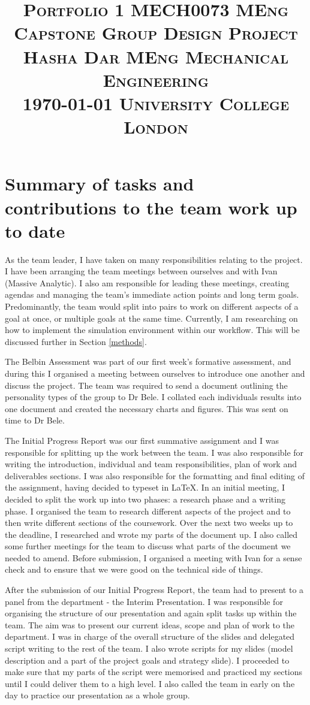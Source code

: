 \documentclass[11pt]{article}
\title{
    \textsc{\huge Portfolio 1 }\hfill \textsc{\large MECH0073 MEng Capstone Group Design Project}\\%
    \textsc{\large Hasha Dar} \hfill \textsc{\large MEng Mechanical Engineering }\\
    \textsc{\large \today} \hfill \textsc{\large University College London }
}
\date{}
\begin{document}
\maketitle
\section{Summary of tasks and contributions to the team work up to date}
As the team leader, I have taken on many responsibilities relating to the project. I have been arranging the team meetings between ourselves and with Ivan (Massive Analytic). I also am responsible for leading these meetings, creating agendas and managing the team's immediate action points and long term goals. Predominantly, the team would split into pairs to work on different aspects of a goal at once, or multiple goals at the same time. Currently, I am researching on how to implement the simulation environment within our workflow. This will be discussed further in Section \ref{methods}.

The Belbin Assessment was part of our first week's formative assessment, and during this I organised a meeting between ourselves to introduce one another and discuss the project. The team was required to send a document outlining the personality types of the group to Dr Bele. I collated each individuals results into one document and created the necessary charts and figures. This was sent on time to Dr Bele.

The Initial Progress Report was our first summative assignment and I was responsible for splitting up the work between the team. I was also responsible for writing the introduction, individual and team responsibilities, plan of work and deliverables sections. I was also responsible for the formatting and final editing of the assignment, having decided to typeset in \LaTeX. In an initial meeting, I decided to split the work up into two phases: a research phase and a writing phase. I organised the team to research different aspects of the project and to then write different sections of the coursework. Over the next two weeks up to the deadline, I researched and wrote my parts of the document up. I also called some further meetings for the team to discuss what parts of the document we needed to amend. Before submission, I organised a meeting with Ivan for a sense check and to ensure that we were good on the technical side of things.

After the submission of our Initial Progress Report, the team had to present to a panel from the department - the Interim Presentation. I was responsible for organising the structure of our presentation and again split tasks up within the team. The aim was to present our current ideas, scope and plan of work to the department. I was in charge of the overall structure of the slides and delegated script writing to the rest of the team. I also wrote scripts for my slides (model description and a part of the project goals and strategy slide). I proceeded to make sure that my parts of the script were memorised and practiced my sections until I could deliver them to a high level. I also called the team in early on the day to practice our presentation as a whole group.
\end{document}
